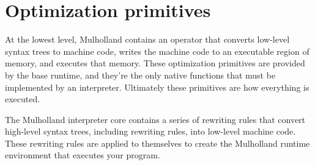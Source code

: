 \documentclass{report}
\begin{document}
\section{Optimization primitives}
    At the lowest level, Mulholland contains an operator that converts low-level syntax trees to machine code, writes the machine code to an executable region of memory, and executes that
    memory. These optimization primitives are provided by the base runtime, and they're the only native functions that must be implemented by an interpreter. Ultimately these primitives are
    how everything is executed.

    The Mulholland interpreter core contains a series of rewriting rules that convert high-level syntax trees, including rewriting rules, into low-level machine code. These rewriting rules are
    applied to themselves to create the Mulholland runtime environment that executes your program.
\end{document}
